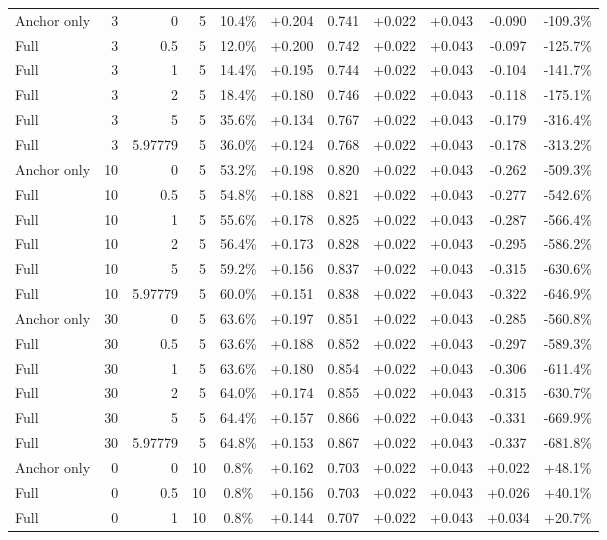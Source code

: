 \begin{table}[htbp]
\begin{tabular}{lrrrccccccc}
Anchor only & 3 & 0 & 5 & 10.4\% & +0.204 & 0.741 & +0.022 & +0.043 & -0.090 & -109.3\% \\
Full & 3 & 0.5 & 5 & 12.0\% & +0.200 & 0.742 & +0.022 & +0.043 & -0.097 & -125.7\% \\
Full & 3 & 1 & 5 & 14.4\% & +0.195 & 0.744 & +0.022 & +0.043 & -0.104 & -141.7\% \\
Full & 3 & 2 & 5 & 18.4\% & +0.180 & 0.746 & +0.022 & +0.043 & -0.118 & -175.1\% \\
Full & 3 & 5 & 5 & 35.6\% & +0.134 & 0.767 & +0.022 & +0.043 & -0.179 & -316.4\% \\
Full & 3 & 5.97779 & 5 & 36.0\% & +0.124 & 0.768 & +0.022 & +0.043 & -0.178 & -313.2\% \\
Anchor only & 10 & 0 & 5 & 53.2\% & +0.198 & 0.820 & +0.022 & +0.043 & -0.262 & -509.3\% \\
Full & 10 & 0.5 & 5 & 54.8\% & +0.188 & 0.821 & +0.022 & +0.043 & -0.277 & -542.6\% \\
Full & 10 & 1 & 5 & 55.6\% & +0.178 & 0.825 & +0.022 & +0.043 & -0.287 & -566.4\% \\
Full & 10 & 2 & 5 & 56.4\% & +0.173 & 0.828 & +0.022 & +0.043 & -0.295 & -586.2\% \\
Full & 10 & 5 & 5 & 59.2\% & +0.156 & 0.837 & +0.022 & +0.043 & -0.315 & -630.6\% \\
Full & 10 & 5.97779 & 5 & 60.0\% & +0.151 & 0.838 & +0.022 & +0.043 & -0.322 & -646.9\% \\
Anchor only & 30 & 0 & 5 & 63.6\% & +0.197 & 0.851 & +0.022 & +0.043 & -0.285 & -560.8\% \\
Full & 30 & 0.5 & 5 & 63.6\% & +0.188 & 0.852 & +0.022 & +0.043 & -0.297 & -589.3\% \\
Full & 30 & 1 & 5 & 63.6\% & +0.180 & 0.854 & +0.022 & +0.043 & -0.306 & -611.4\% \\
Full & 30 & 2 & 5 & 64.0\% & +0.174 & 0.855 & +0.022 & +0.043 & -0.315 & -630.7\% \\
Full & 30 & 5 & 5 & 64.4\% & +0.157 & 0.866 & +0.022 & +0.043 & -0.331 & -669.9\% \\
Full & 30 & 5.97779 & 5 & 64.8\% & +0.153 & 0.867 & +0.022 & +0.043 & -0.337 & -681.8\% \\
Anchor only & 0 & 0 & 10 & 0.8\% & +0.162 & 0.703 & +0.022 & +0.043 & +0.022 & +48.1\% \\
Full & 0 & 0.5 & 10 & 0.8\% & +0.156 & 0.703 & +0.022 & +0.043 & +0.026 & +40.1\% \\
Full & 0 & 1 & 10 & 0.8\% & +0.144 & 0.707 & +0.022 & +0.043 & +0.034 & +20.7\% \\

\end{tabular}
\end{table}
